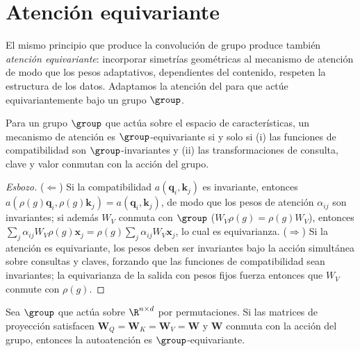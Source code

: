 \section{Atenci\'on equivariante}
\label{sec:groups:equivariant-attention}

El mismo principio que produce la convoluci\'on de grupo produce tambi\'en
\emph{atenci\'on equivariante}: incorporar simetr\'ias geom\'etricas al mecanismo
de atenci\'on de modo que los pesos adaptativos, dependientes del contenido,
respeten la estructura de los datos. Adaptamos la atenci\'on del 
para que act\'ue equivariantemente bajo un grupo $\group$.

\begin{theorem}
\label{thm:groups:equivariant-attention}
Para un grupo $\group$ que act\'ua sobre el espacio de caracter\'isticas, un
mecanismo de atenci\'on es $\group$-equivariante si y solo si (i) las funciones
de compatibilidad son $\group$-invariantes y (ii) las transformaciones de
consulta, clave y valor conmutan con la acci\'on del grupo.
\end{theorem}

\begin{proof}[Esbozo]
($\Leftarrow$) Si la compatibilidad $a(\mathbf{q}_i, \mathbf{k}_j)$ es
invariante, entonces $a(\rho(g)\mathbf{q}_i, \rho(g)\mathbf{k}_j) =
a(\mathbf{q}_i, \mathbf{k}_j)$, de modo que los pesos de atenci\'on $\alpha_{ij}$
son invariantes; si adem\'as $W_V$ conmuta con $\group$ ($W_V \rho(g) = \rho(g)
W_V$), entonces $\sum_j \alpha_{ij} W_V \rho(g)\mathbf{x}_j = \rho(g) \sum_j
\alpha_{ij} W_V \mathbf{x}_j$, lo cual es equivarianza. ($\Rightarrow$) Si la
atenci\'on es equivariante, los pesos deben ser invariantes bajo la acci\'on
simult\'anea sobre consultas y claves, forzando que las funciones de
compatibilidad sean invariantes; la equivarianza de la salida con pesos fijos
fuerza entonces que $W_V$ conmute con $\rho(g)$.
\end{proof}

\begin{lemma}
\label{lem:groups:self-attention-equivariance}
Sea $\group$ que act\'ua sobre $\R^{n \times d}$ por permutaciones. Si las
matrices de proyecci\'on satisfacen $\mathbf{W}_Q = \mathbf{W}_K = \mathbf{W}_V =
\mathbf{W}$ y $\mathbf{W}$ conmuta con la acci\'on del grupo, entonces la
autoatenci\'on es $\group$-equivariante.
\end{lemma}

